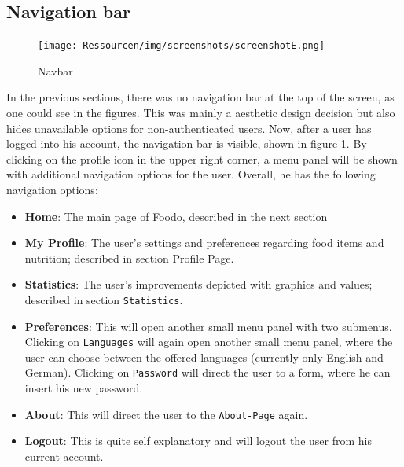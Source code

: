 \subsection*{Navigation bar}
\vspace{0.5em}
\begin{figure}[H]
	\captionsetup{justification=centering}
	\begin{center}
		\texttt{[image: Ressourcen/img/screenshots/screenshotE.png]}
		\vspace{-3em}
		\caption{Navbar}
		\label{fig:navbar}
	\end{center}
\end{figure}
\vspace{-3em}
In the previous sections, there was no navigation bar at the top of the screen, as one could see in the figures. This was mainly a aesthetic design decision but also hides unavailable options for non-authenticated users. Now, after a user has logged into his account, the navigation bar is visible, shown in figure \ref{fig:navbar}. By clicking on the profile icon in the upper right corner, a menu panel will be shown with additional navigation options for the user. Overall, he has the following navigation options:
\begin{itemize}
\item \textbf{Home}: The main page of Foodo, described in the next section
\item \textbf{My Profile}: The user's settings and preferences regarding food items and nutrition; described in section Profile Page.
\item \textbf{Statistics}: The user's improvements depicted with graphics and values; described in section \texttt{Statistics}.
\item \textbf{Preferences}: This will open another small menu panel with two submenus. Clicking on \texttt{Languages} will again open another small menu panel, where the user can choose between the offered languages (currently only English and German). Clicking on \texttt{Password} will direct the user to a form, where he can insert his new password.
\item \textbf{About}: This will direct the user to the \texttt{About-Page} again.
\item \textbf{Logout}: This is quite self explanatory and will logout the user from his current account.
\end{itemize}
